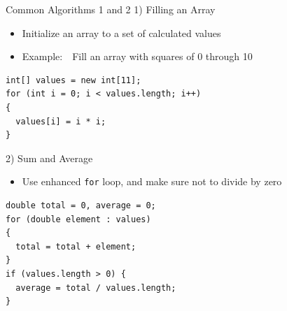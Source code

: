 \documentclass[aspectratio=43,10pt,t]{beamer}
\newcommand{\code}[1]{\texttt{#1}}
\begin{document}
\begin{frame}[fragile]{Common Algorithms 1 and 2}
  1) Filling an Array
  \begin{itemize}
    \item Initialize an array to a set of calculated values
    \item Example:\ \ Fill an array with squares of 0 through 10
  \end{itemize}
\begin{lstlisting}[linewidth=0.62\linewidth,xleftmargin=0.2\linewidth]
int[] values = new int[11];
for (int i = 0; i < values.length; i++)
{
  values[i] = i * i;
}
\end{lstlisting}
  \vskip2mm
  2) Sum and Average
  \begin{itemize}
    \item Use enhanced \code{for} loop, and make sure not to divide by zero
  \end{itemize}
\begin{lstlisting}[linewidth=0.8\linewidth,xleftmargin=0.08\linewidth]
double total = 0, average = 0;
for (double element : values)
{
  total = total + element;
}
if (values.length > 0) {
  average = total / values.length;
}
\end{lstlisting}
\end{frame}
\end{document}
